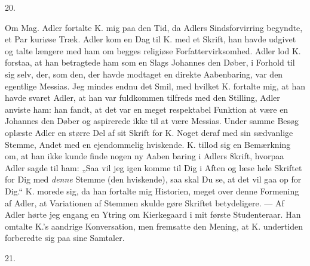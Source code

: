 \documentclass[12pt,a4paper,openany]{book}
\newcommand{\secnum}[1]{\par\begin{center}#1\end{center}\par\nobreak}
\newcommand{\opage}[1]{\marginnote{\footnotesize\textit{[#1]}}}
\begin{document}
\secnum{20.}

Om Mag. Adler fortalte K. mig paa den Tid, da Adlers
Sindsforvirring begyndte, et Par kuriøse Træk. Adler kom en Dag
til K. med et Skrift, han havde udgivet og talte længere med ham
om begges religiøse Forfattervirksomhed. Adler lod K. forstaa, at
han betragtede ham som en Slags Johannes den Døber, i Forhold til
sig selv, der, som den, der havde modtaget en direkte Aabenbaring,
var den egentlige Messias. Jeg mindes
endnu det Smil, med hvilket K. fortalte mig, at han havde svaret
Adler, at han var fuldkommen tilfreds med den Stilling, Adler
anviste ham: han fandt, at det var en meget respektabel Funktion
at være en Johannes den Døber og aspirerede ikke til at være
Messias. Under samme Besøg oplæste Adler en større Del af sit
Skrift for K. Noget deraf med sin sædvanlige Stemme, Andet med en
ejendommelig hviskende. K. tillod sig en Bemærkning om, at han
ikke kunde finde nogen ny Aaben%
\opage{352}baring i Adlers
8krift, hvorpaa Adler sagde til ham: „Saa vil jeg igen komme til
Dig i Aften og læse hele Skriftet for Dig med \emph{denne} Stemme
(den hviskende), saa skal Du se, at det vil gaa op for Dig.“ K.
morede sig, da han fortalte mig Historien, meget over denne
Formening af Adler, at Variationen af Stemmen skulde gøre
Skriftet betydeligere. --- Af Adler hørte jeg engang en Ytring om
Kierkegaard i mit første Studenteraar. Han omtalte K.’s aandrige
Konversation, men fremsatte den Mening, at K. undertiden
forberedte sig paa sine Samtaler.

\secnum{21.}
\end{document}
